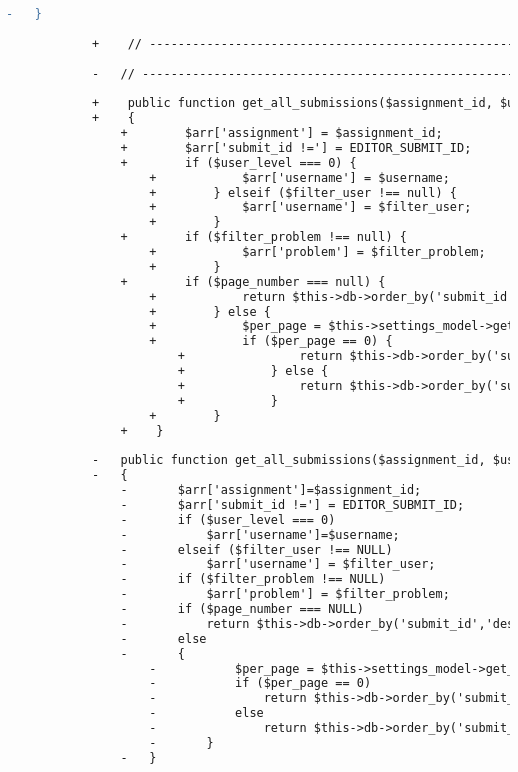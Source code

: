 \begin{lstlisting}[language=diff, caption=Perubahan pada kode Submit\_model.php]
				-	}
			
			+    // ------------------------------------------------------------------------
			
			-	// ------------------------------------------------------------------------
			
			+    public function get_all_submissions($assignment_id, $user_level, $username, $page_number = null, $filter_user = null, $filter_problem = null)
			+    {
				+        $arr['assignment'] = $assignment_id;
				+        $arr['submit_id !='] = EDITOR_SUBMIT_ID;
				+        if ($user_level === 0) {
					+            $arr['username'] = $username;
					+        } elseif ($filter_user !== null) {
					+            $arr['username'] = $filter_user;
					+        }
				+        if ($filter_problem !== null) {
					+            $arr['problem'] = $filter_problem;
					+        }
				+        if ($page_number === null) {
					+            return $this->db->order_by('submit_id', 'desc')->get_where('submissions', $arr)->result_array();
					+        } else {
					+            $per_page = $this->settings_model->get_setting('results_per_page_all');
					+            if ($per_page == 0) {
						+                return $this->db->order_by('submit_id', 'desc')->get_where('submissions', $arr)->result_array();
						+            } else {
						+                return $this->db->order_by('submit_id', 'desc')->limit($per_page, ($page_number - 1) * $per_page)->get_where('submissions', $arr)->result_array();
						+            }
					+        }
				+    }
			
			-	public function get_all_submissions($assignment_id, $user_level, $username, $page_number = NULL, $filter_user = NULL, $filter_problem = NULL)
			-	{
				-		$arr['assignment']=$assignment_id;
				-		$arr['submit_id !='] = EDITOR_SUBMIT_ID;
				-		if ($user_level === 0)
				-			$arr['username']=$username;
				-		elseif ($filter_user !== NULL)
				-			$arr['username'] = $filter_user;
				-		if ($filter_problem !== NULL)
				-			$arr['problem'] = $filter_problem;
				-		if ($page_number === NULL)
				-			return $this->db->order_by('submit_id','desc')->get_where('submissions', $arr)->result_array();
				-		else
				-		{
					-			$per_page = $this->settings_model->get_setting('results_per_page_all');
					-			if ($per_page == 0)
					-				return $this->db->order_by('submit_id','desc')->get_where('submissions', $arr)->result_array();
					-			else
					-				return $this->db->order_by('submit_id','desc')->limit($per_page,($page_number-1)*$per_page)->get_where('submissions', $arr)->result_array();
					-		}
				-	}
			

\end{lstlisting}
